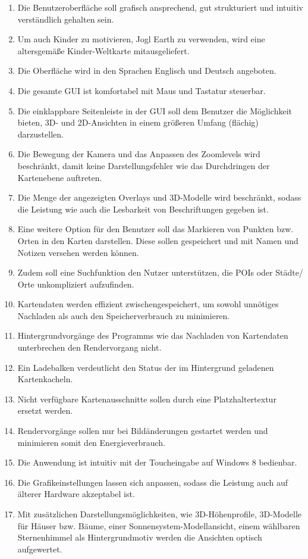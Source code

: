 \documentclass[10pt]{scrreprt}
\begin{document}
\begin{enumerate}[leftmargin=2cm]
\item Die Benutzeroberfläche soll grafisch ansprechend, gut strukturiert und intuitiv verständlich gehalten sein.
\item \W Um auch Kinder zu motivieren, Jogl Earth zu verwenden, wird eine altersgemäße Kinder-Weltkarte mitausgeliefert.
\item Die Oberfläche wird in den Sprachen Englisch und Deutsch angeboten.
\item Die gesamte GUI ist komfortabel mit Maus und Tastatur steuerbar.
\item Die einklappbare Seitenleiste in der GUI soll dem Benutzer die Möglichkeit bieten, 3D- und 2D-Ansichten in einem größeren Umfang (flächig) darzustellen.
\item Die Bewegung der Kamera und das Anpassen des Zoomlevels wird beschränkt, damit keine Darstellungsfehler wie das Durchdringen der Kartenebene auftreten.
\item Die Menge der angezeigten Overlays und 3D-Modelle wird beschränkt, sodass die Leistung wie auch die Lesbarkeit von Beschriftungen gegeben ist.
\item Eine weitere Option für den Benutzer soll das Markieren von Punkten bzw. Orten in den Karten darstellen. Diese sollen gespeichert und mit Namen und Notizen versehen werden können.
\item Zudem soll eine Suchfunktion den Nutzer unterstützen, die POIs oder Städte/ Orte unkompliziert aufzufinden.
\item Kartendaten werden effizient zwischengespeichert, um sowohl unnötiges Nachladen als auch den Speicherverbrauch zu minimieren.
\item Hintergrundvorgänge des Programms wie das Nachladen von Kartendaten unterbrechen den Rendervorgang nicht.
\item Ein Ladebalken verdeutlicht den Status der im Hintergrund geladenen Kartenkacheln.
\item \W Nicht verfügbare Kartenausschnitte sollen durch eine Platzhaltertextur ersetzt werden.
\item \W Rendervorgänge sollen nur bei Bildänderungen gestartet werden und minimieren somit den Energieverbrauch.
\item \W Die Anwendung ist intuitiv mit der Toucheingabe auf Windows 8 bedienbar.
\item \W Die Grafikeinstellungen lassen sich anpassen, sodass die Leistung auch auf älterer Hardware akzeptabel ist.
\item \W Mit zusätzlichen Darstellungsmöglichkeiten, wie 3D-Höhenprofile, 3D-Modelle für Häuser bzw. Bäume, einer Sonnensystem-Modellansicht, einem wählbaren Sternenhimmel als Hintergrundmotiv werden die Ansichten optisch aufgewertet.


\end{enumerate}
\end{document}
